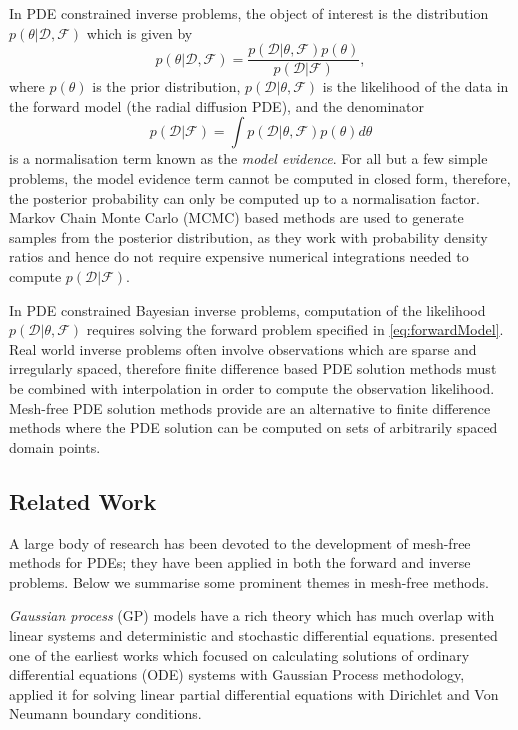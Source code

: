 In PDE constrained inverse problems, the object of interest is the distribution  
$p(\theta \rvert \mathcal{D}, \mathcal{F})$ which is given by 
\[
  p(\theta \rvert \mathcal{D}, \mathcal{F}) = \frac{
    p(\mathcal{D} \rvert \theta, \mathcal{F}) p(\theta)
  }{
    p(\mathcal{D}\rvert\mathcal{F})
  }, 
\]
where $p(\theta)$ is the prior distribution, $p(\mathcal{D} \rvert \theta, \mathcal{F})$ is the 
likelihood of the data in the forward model (the radial diffusion PDE), and the denominator 
\[
  p(\mathcal{D}\rvert\mathcal{F}) = \int{
    p(\mathcal{D} \rvert \theta, \mathcal{F}) p(\theta) d\theta
  }  
\] 
is a normalisation term known as the \emph{model evidence}. For all but a few simple problems, the 
model evidence term cannot be computed in closed form, therefore, the posterior probability can 
only be computed up to a normalisation factor. Markov Chain Monte Carlo (MCMC) based methods are 
used to generate samples from the posterior distribution, as they work with probability density 
ratios and hence do not require expensive numerical integrations needed to compute 
$p(\mathcal{D}\rvert\mathcal{F})$. 

In PDE constrained Bayesian inverse problems, computation of the likelihood 
$p(\mathcal{D} \rvert \theta, \mathcal{F})$ requires solving the forward problem specified in 
\cref{eq:forwardModel}. Real world inverse problems often involve observations which are sparse and 
irregularly spaced, therefore finite difference based PDE solution methods must be combined with 
interpolation in order to compute the observation likelihood. Mesh-free PDE solution methods 
provide are an alternative to finite difference methods where the PDE solution can be computed 
on sets of arbitrarily spaced domain points.

\subsection{Related Work}

A large body of research has been devoted to the development of mesh-free methods for PDEs; they 
have been applied in both the forward and inverse problems. Below we summarise some prominent 
themes in mesh-free methods.

\emph{Gaussian process} (GP) models \citep{Rasmussen:2005:GPM:1162254} have a rich theory 
which has much overlap with linear systems and deterministic and stochastic differential equations. 
\citet{Skilling1992} presented one of the earliest works which focused on calculating solutions of 
ordinary differential equations (ODE) systems with Gaussian Process methodology, \citet{Graepel} 
applied it for solving linear partial differential equations with Dirichlet and Von Neumann 
boundary conditions.

